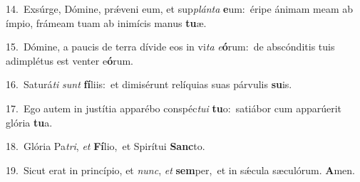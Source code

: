 {\numbfont\textcolor{\numbcolor}{14.}}~Exsúrge, Dómine, prǽveni eum, et sup\-\textit{plán}\-\textit{ta} \textbf{e}\-um:~\star éripe ánimam meam ab ímpio, frámeam tuam ab inimícis manus \textbf{tu}\-æ.\par
{\numbfont\textcolor{\numbcolor}{15.}}~Dómine, a paucis de terra dívide eos in vi\textit{ta} \textit{e}\-\textbf{ó}rum:~\star de abscónditis tuis adimplétus est venter e\-\textbf{ó}\-rum.\par
{\numbfont\textcolor{\numbcolor}{16.}}~Saturá\textit{ti} \textit{sunt} \textbf{fí}\-liis:~\star et dimisérunt relíquias suas párvulis \textbf{su}\-is.\par
{\numbfont\textcolor{\numbcolor}{17.}}~Ego autem in justítia apparébo conspéc\-\textit{tu}\-\textit{i} \textbf{tu}\-o:~\star satiábor cum apparúerit glória \textbf{tu}\-a.\par
{\numbfont\textcolor{\numbcolor}{18.}}~Glória Pa\-\textit{tri}\-, \textit{et} \textbf{Fí}\-lio,~\star et Spirítui \textbf{Sanc}\-to.\par
{\numbfont\textcolor{\numbcolor}{19.}}~Sicut erat in princípio, et \textit{nunc}\-, \textit{et} \textbf{sem}\-per,~\star et in sǽcula sæculórum. \textbf{A}\-men.\par
